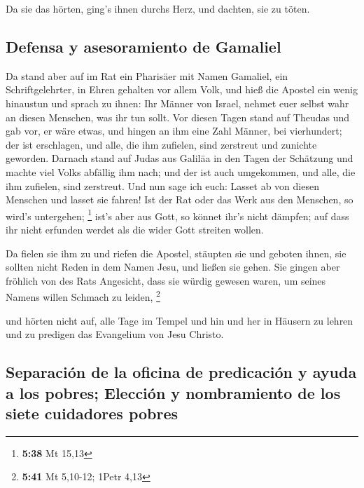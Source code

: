  Da sie das hörten, ging's ihnen durchs Herz, und
dachten, sie zu töten.

\hypertarget{defensa-y-asesoramiento-de-gamaliel}{%
\subsection{Defensa y asesoramiento de
Gamaliel}\label{defensa-y-asesoramiento-de-gamaliel}}

 Da stand aber auf im Rat ein Pharisäer mit Namen
Gamaliel, ein Schriftgelehrter, in Ehren gehalten vor allem Volk, und
hieß die Apostel ein wenig hinaustun  und sprach zu
ihnen: Ihr Männer von Israel, nehmet euer selbst wahr an diesen
Menschen, was ihr tun sollt.  Vor diesen Tagen stand auf
Theudas und gab vor, er wäre etwas, und hingen an ihm eine Zahl Männer,
bei vierhundert; der ist erschlagen, und alle, die ihm zufielen, sind
zerstreut und zunichte geworden.  Darnach stand auf Judas
aus Galiläa in den Tagen der Schätzung und machte viel Volks abfällig
ihm nach; und der ist auch umgekommen, und alle, die ihm zufielen, sind
zerstreut.  Und nun sage ich euch: Lasset ab von diesen
Menschen und lasset sie fahren! Ist der Rat oder das Werk aus den
Menschen, so wird's untergehen; \footnote{\textbf{5:38} Mt 15,13}
 ist's aber aus Gott, so könnet ihr's nicht dämpfen; auf
dass ihr nicht erfunden werdet als die wider Gott streiten wollen.

 Da fielen sie ihm zu und riefen die Apostel, stäupten
sie und geboten ihnen, sie sollten nicht Reden in dem Namen Jesu, und
ließen sie gehen.  Sie gingen aber fröhlich von des Rats
Angesicht, dass sie würdig gewesen waren, um seines Namens willen
Schmach zu leiden, \footnote{\textbf{5:41} Mt 5,10-12; 1Petr 4,13}

 und hörten nicht auf, alle Tage im Tempel und hin und
her in Häusern zu lehren und zu predigen das Evangelium von Jesu
Christo.

\hypertarget{separaciuxf3n-de-la-oficina-de-predicaciuxf3n-y-ayuda-a-los-pobres-elecciuxf3n-y-nombramiento-de-los-siete-cuidadores-pobres}{%
\subsection{Separación de la oficina de predicación y ayuda a los
pobres; Elección y nombramiento de los siete cuidadores
pobres}\label{separaciuxf3n-de-la-oficina-de-predicaciuxf3n-y-ayuda-a-los-pobres-elecciuxf3n-y-nombramiento-de-los-siete-cuidadores-pobres}}


